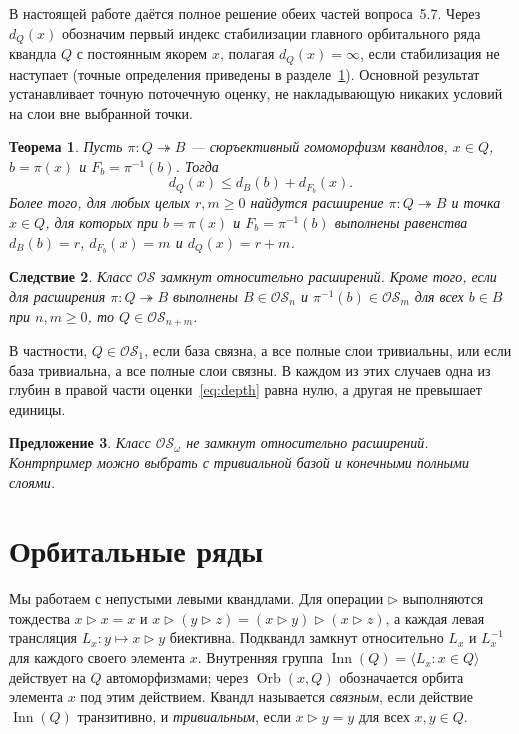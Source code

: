 \documentclass[11pt,a4paper]{article}
\newtheorem{theorem}{Теорема}[section]
\newtheorem{proposition}[theorem]{Предложение}
\newtheorem{corollary}[theorem]{Следствие}
\theoremstyle{remark}
\newcommand{\OS}{\mathcal{OS}}
\newcommand{\Inn}{\operatorname{Inn}}
\newcommand{\Orb}{\operatorname{Orb}}
\newcommand{\conj}{\triangleright}
\begin{document}
В настоящей работе даётся полное решение обеих частей вопроса~5.7.
Через \(d_Q(x)\) обозначим первый индекс стабилизации главного
орбитального ряда квандла \(Q\) с постоянным якорем \(x\), полагая
\(d_Q(x)=\infty\), если стабилизация не наступает (точные определения
приведены в разделе~\ref{sec:prelim}). Основной результат устанавливает
точную поточечную оценку, не накладывающую никаких условий на слои вне
выбранной точки.

\begin{theorem}\label{thm:main}
Пусть \(\pi\colon Q\twoheadrightarrow B\) --- сюръективный гомоморфизм
квандлов, \(x\in Q\), \(b=\pi(x)\) и \(F_b=\pi^{-1}(b)\). Тогда
\begin{equation}\label{eq:depth}
  d_Q(x)\le d_B(b)+d_{F_b}(x).
\end{equation}
Более того, для любых целых \(r,m\ge 0\) найдутся расширение
\(\pi\colon Q\twoheadrightarrow B\) и точка \(x\in Q\), для которых
при \(b=\pi(x)\) и \(F_b=\pi^{-1}(b)\) выполнены равенства
\(d_B(b)=r\), \(d_{F_b}(x)=m\) и \(d_Q(x)=r+m\).
\end{theorem}

\begin{corollary}\label{cor:closure}
Класс \(\OS\) замкнут относительно расширений. Кроме того, если для
расширения \(\pi\colon Q\twoheadrightarrow B\) выполнены
\(B\in\OS_n\) и \(\pi^{-1}(b)\in\OS_m\) для всех \(b\in B\)
при \(n,m\ge 0\), то
\(Q\in\OS_{n+m}\).
\end{corollary}

В частности, \(Q\in\OS_1\), если база связна, а все полные слои
тривиальны, или если база тривиальна, а все полные слои связны.
В каждом из этих случаев одна из глубин в правой части
оценки~\eqref{eq:depth} равна нулю, а другая не превышает единицы.

\begin{proposition}\label{prop:negative}
Класс \(\OS_\omega\) не замкнут относительно расширений. Контрпример
можно выбрать с тривиальной базой и конечными полными слоями.
\end{proposition}

\section{Орбитальные ряды}\label{sec:prelim}

Мы работаем с непустыми левыми квандлами. Для операции \(\conj\)
выполняются тождества \(x\conj x=x\) и
\(x\conj(y\conj z)=(x\conj y)\conj(x\conj z)\), а каждая левая трансляция
\(L_x\colon y\mapsto x\conj y\) биективна. Подквандл замкнут относительно
\(L_x\) и \(L_x^{-1}\) для каждого своего элемента \(x\). Внутренняя
группа \(\Inn(Q)=\langle L_x : x\in Q\rangle\) действует на \(Q\)
автоморфизмами; через \(\Orb(x,Q)\) обозначается орбита элемента \(x\)
под этим действием. Квандл называется \emph{связным}, если действие
\(\Inn(Q)\) транзитивно, и \emph{тривиальным}, если \(x\conj y=y\) для
всех \(x,y\in Q\).
\end{document}
